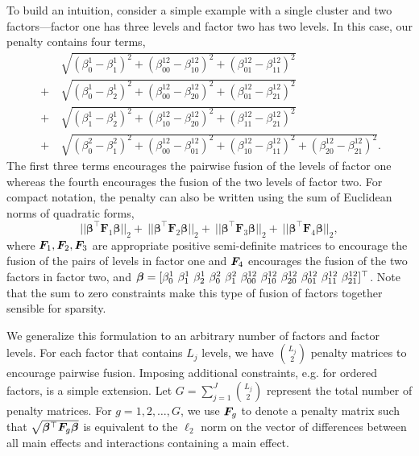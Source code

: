 To build an intuition, consider a simple example with a single cluster
and two factors---factor one has three levels and factor two has two
levels.  In this case, our penalty contains four terms,
\begin{equation*}
\begin{split}
& \sqrt{(\beta^1_0 - \beta^1_1)^2 +  (\beta^{12}_{00} -
    \beta^{12}_{10})^2 + (\beta^{12}_{01} -
    \beta^{12}_{11})^2}\\
  ~+~ &\sqrt{(\beta^1_0 - \beta^1_2)^2 +
    (\beta^{12}_{00} - \beta^{12}_{20})^2 +
    (\beta^{12}_{01}-\beta^{12}_{21})^2}\\
~+~ & \sqrt{(\beta^1_1 - \beta^1_2)^2 + (\beta^{12}_{10} - \beta^{12}_{20})^2 + (\beta^{12}_{11} - \beta^{12}_{21})^2}\\
~+~ & \sqrt{(\beta^2_0 - \beta^2_1)^2 +  (\beta^{12}_{00}-\beta^{12}_{01})^2 + (\beta^{12}_{10} - \beta^{12}_{11})^2 + (\beta^{12}_{20}-\beta^{12}_{21})^2} .
\end{split}
\end{equation*}
The first three terms encourages the pairwise fusion of the levels of
factor one whereas the fourth encourages the fusion of the two levels
of factor two. For compact notation, the penalty can also be written
using the sum of Euclidean norms of quadratic forms,
\begin{equation*}
 || \bm{\beta}^\top \bm{F}_1 \bm{\beta} ||_2 +  \ ||
 \bm{\beta}^\top \bm{F}_2 \bm{\beta} ||_2 + \ ||
 \bm{\beta}^\top \bm{F}_3 \bm{\beta} ||_2 + \ ||
 \bm{\beta}^\top \bm{F}_4 \bm{\beta} ||_2,  
\end{equation*}
where $\bm{F}_1, \bm{F}_2, \bm{F}_3$ are appropriate positive semi-definite
matrices to encourage the fusion of the pairs of levels in factor one
and $\bm{F}_4$ encourages the fusion of the two factors in factor two,
and
$\bm{\beta} = [\beta^1_0\ \beta^1_1\ \beta^1_2\ \beta^2_0\ \beta^2_1\
\beta^{12}_{00}\ \beta^{12}_{10}\ \beta^{12}_{20}\ \beta^{12}_{01}\
\beta^{12}_{11}\ \beta^{12}_{21}]^\top$.
Note that the sum to zero constraints make this type of fusion of factors together sensible for sparsity. 

We generalize this formulation to an arbitrary number of factors and
factor levels. For each factor that contains $L_j$ levels, we have
$\binom{L_j}{2}$ penalty matrices to encourage pairwise
fusion. Imposing additional constraints, e.g. for ordered factors, is
a simple extension. Let $G = \sum_{j=1}^J \binom{L_j}{2}$ represent
the total number of penalty matrices.  For $g=1,2,\ldots,G$, we use
$\bm{F}_g$ to denote a penalty matrix such that
$\sqrt{\bm{\beta}^\top\bm{F}_{g}\bm{\beta}}$ is equivalent to the $\ell_2$ norm
on the vector of differences between all main effects and interactions
containing a main effect.

